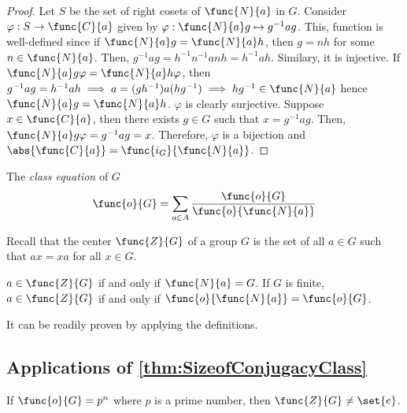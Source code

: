 \begin{proof}
    Let \(S\) be the set of right cosets of \(\func{N}{a}\) in \(G\). Consider \(\varphi : S \to \func{C}{a}\) given by \(\varphi: \func{N}{a}g \mapsto g^{-1}ag\). This, function is well-defined since if \(\func{N}{a}g = \func{N}{a}h\), then \(g = nh\) for some \(n \in \func{N}{a}\). Then, \(g^{-1}ag = h^{-1}n^{-1}anh = h^{-1}ah\). Similary, it is injective. If \(\func{N}{a}g \varphi = \func{N}{a}h \varphi\), then \(g^{-1}ag = h^{-1}a h \implies a=(gh^{-1})a (hg^{-1}) \implies hg^{-1} \in \func{N}{a}\) hence \(\func{N}{a}g = \func{N}{a}h\). \(\varphi\) is clearly surjective. Suppose \(x \in \func{C}{a}\), then there exists \(g \in G\) such that \(x = g^{-1}ag\). Then, \(\func{N}{a}g \varphi = g^{-1}ag = x\). Therefore, \(\varphi\) is a bijection and \(\abs{\func{C}{a}} = \func{i_G}{\func{N}{a}}\).
\end{proof}
\begin{corollary}
    The \textit{class equation} of \(G\)
    \begin{equation*}
        \func{o}{G} = \sum_{a \in A} \dfrac{\func{o}{G}}{\func{o}{\func{N}{a}}}
    \end{equation*}
\end{corollary}

Recall that the center \(\func{Z}{G}\) of a group \(G\) is the set of all \(a \in G\) such that \(ax = xa\) for all \(x \in G\). 

\begin{lemma}
    \(a \in \func{Z}{G}\) if and only if \(\func{N}{a} = G\). If \(G\) is finite, \(a \in \func{Z}{G}\) if and only if \(\func{o}{\func{N}{a}} = \func{o}{G}\).
\end{lemma}

\begin{prooflemma}
    It can be readily proven by applying the definitions.
\end{prooflemma}

\subsection{Applications of \ref{thm:SizeofConjugacyClass}}

\begin{theorem}
    If \(\func{o}{G} = p^n\) where \(p\) is a prime number, then \(\func{Z}{G} \neq \set{e}\).
\end{theorem}


